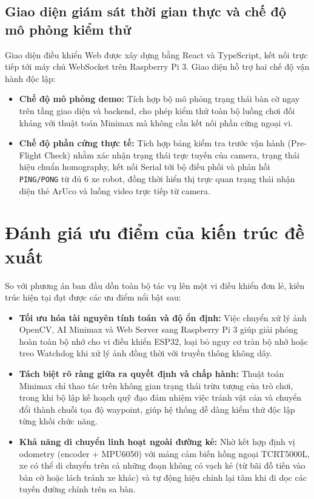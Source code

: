 \documentclass[12pt,a4paper]{report}
\begin{document}
	\subsection{Giao diện giám sát thời gian thực và chế độ mô phỏng kiểm thử}
	Giao diện điều khiển Web được xây dựng bằng React và TypeScript, kết nối trực tiếp tới máy chủ WebSocket trên Raspberry Pi 3. Giao diện hỗ trợ hai chế độ vận hành độc lập:
	\begin{itemize}[leftmargin=1.2cm]
		\item \textbf{Chế độ mô phỏng demo:} Tích hợp bộ mô phỏng trạng thái bàn cờ ngay trên tầng giao diện và backend, cho phép kiểm thử toàn bộ luồng chơi đối kháng với thuật toán Minimax mà không cần kết nối phần cứng ngoại vi.
		\item \textbf{Chế độ phần cứng thực tế:} Tích hợp bảng kiểm tra trước vận hành (Pre-Flight Check) nhằm xác nhận trạng thái trực tuyến của camera, trạng thái hiệu chuẩn homography, kết nối Serial tới bộ điều phối và phản hồi \texttt{PING/PONG} từ đủ 6 xe robot, đồng thời hiển thị trực quan trạng thái nhận diện thẻ ArUco và luồng video trực tiếp từ camera.
	\end{itemize}
	
	\section{Đánh giá ưu điểm của kiến trúc đề xuất}
	So với phương án ban đầu dồn toàn bộ tác vụ lên một vi điều khiển đơn lẻ, kiến trúc hiện tại đạt được các ưu điểm nổi bật sau:
	\begin{itemize}[leftmargin=1.2cm]
		\item \textbf{Tối ưu hóa tài nguyên tính toán và độ ổn định:} Việc chuyển xử lý ảnh OpenCV, AI Minimax và Web Server sang Raspberry Pi 3 giúp giải phóng hoàn toàn bộ nhớ cho vi điều khiển ESP32, loại bỏ nguy cơ tràn bộ nhớ hoặc treo Watchdog khi xử lý ảnh đồng thời với truyền thông không dây.
		\item \textbf{Tách biệt rõ ràng giữa ra quyết định và chấp hành:} Thuật toán Minimax chỉ thao tác trên không gian trạng thái trừu tượng của trò chơi, trong khi bộ lập kế hoạch quỹ đạo đảm nhiệm việc tránh vật cản và chuyển đổi thành chuỗi tọa độ waypoint, giúp hệ thống dễ dàng kiểm thử độc lập từng khối chức năng.
		\item \textbf{Khả năng di chuyển linh hoạt ngoài đường kẻ:} Nhờ kết hợp định vị odometry (encoder + MPU6050) với mảng cảm biến hồng ngoại TCRT5000L, xe có thể di chuyển trên cả những đoạn không có vạch kẻ (từ bãi đỗ tiến vào bàn cờ hoặc lách tránh xe khác) và tự động hiệu chỉnh lại tâm khi đi dọc các tuyến đường chính trên sa bàn.
	\end{itemize}
	
\end{document}
